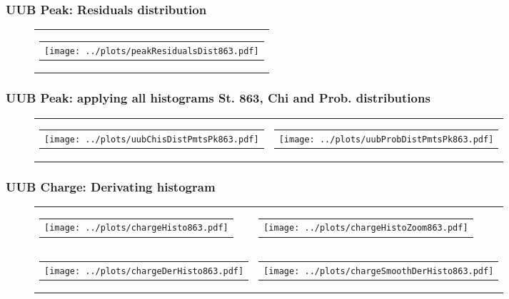 \documentclass[aspectratio=169]{beamer}
\begin{document}
\begin{frame}
  \frametitle{UUB Peak: Residuals distribution}
  \begin{figure}
    \centering
    \begin{tabularx}{\textwidth}{C}
      \begin{tabular}{l}
        \texttt{[image: ../plots/peakResidualsDist863.pdf]}
      \end{tabular}
    \end{tabularx}
  \end{figure}
\end{frame}


\begin{frame}
  \frametitle{UUB Peak: applying all histograms St. 863, Chi and Prob. distributions}
  \begin{figure}
    \centering
    \begin{tabularx}{\textwidth}{CC}
      \begin{tabular}{l}
        \texttt{[image: ../plots/uubChisDistPmtsPk863.pdf]}
      \end{tabular}
      &
      \begin{tabular}{l}
        \texttt{[image: ../plots/uubProbDistPmtsPk863.pdf]}
      \end{tabular}
    \end{tabularx}
  \end{figure}
\end{frame}



\begin{frame}
  \frametitle{UUB Charge: Derivating histogram} %
  \begin{figure}
    \centering
    \begin{tabularx}{\textwidth}{CC}
      \begin{tabular}{l}
        \texttt{[image: ../plots/chargeHisto863.pdf]}
      \end{tabular}
      &
      \begin{tabular}{l}
        \texttt{[image: ../plots/chargeHistoZoom863.pdf]}
      \end{tabular}
      \\
      \begin{tabular}{l}
        \texttt{[image: ../plots/chargeDerHisto863.pdf]}
      \end{tabular}
      &
      \begin{tabular}{l}
        \texttt{[image: ../plots/chargeSmoothDerHisto863.pdf]}
      \end{tabular}
    \end{tabularx}
  \end{figure}
\end{frame}
\end{document}
